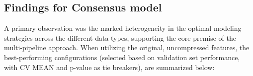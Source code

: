 \documentclass[12pt,a4paper]{report}
\begin{document}
\subsection{Findings for Consensus model}
\noindent
A primary observation was the marked heterogeneity in the optimal modeling strategies across the different data types, supporting the core premise of the multi-pipeline approach. When utilizing the original, uncompressed features, the best-performing configurations (selected based on validation set performance, with CV MEAN and p-value as tie breakers), are summarized below:
\begin{table}[H]
    \centering
    \hspace*{-1cm}
    \caption[Optimal Modeling Configurations Uncompressed Features]{Optimal Modeling Configurations for Uncompressed Features}
    \label{tab:optimal_configs_uncompressed}
\end{table}
\end{document}
